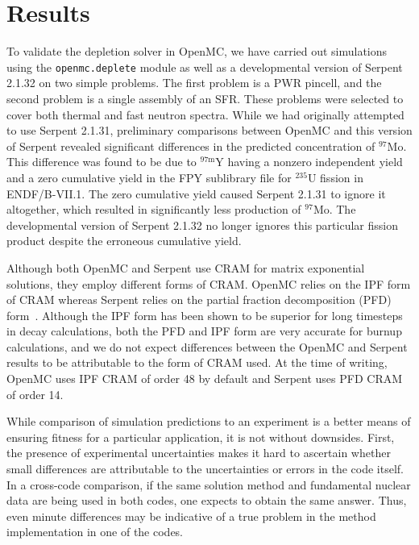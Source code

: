 \documentclass[3p,authoryear]{elsarticle}
\begin{document}
\section{Results}
\label{sec:results}

To validate the depletion solver in OpenMC, we have carried out simulations
using the \texttt{openmc.deplete} module as well as a developmental version of
Serpent 2.1.32 on two simple problems. The first problem is a PWR pincell, and
the second problem is a single assembly of an SFR. These problems were selected
to cover both thermal and fast neutron spectra. While we had originally
attempted to use Serpent 2.1.31, preliminary comparisons between OpenMC and this
version of Serpent revealed significant differences in the predicted
concentration of $^{97}$Mo. This difference was found to be due to
$^{97\text{m}}$Y having a nonzero independent yield and a zero cumulative yield
in the FPY sublibrary file for $^{235}$U fission in ENDF/B-VII.1. The zero
cumulative yield caused Serpent 2.1.31 to ignore it altogether, which resulted
in significantly less production of $^{97}$Mo. The developmental version of
Serpent 2.1.32 no longer ignores this particular fission product despite the
erroneous cumulative yield.

Although both OpenMC and Serpent use CRAM for matrix exponential solutions, they
employ different forms of CRAM. OpenMC relies on the IPF form of CRAM whereas
Serpent relies on the partial fraction decomposition (PFD)
form~\citep{pusa2016nse}. Although the IPF form has been shown to be superior
for long timesteps in decay calculations, both the PFD and IPF form are very
accurate for burnup calculations, and we do not expect differences between the
OpenMC and Serpent results to be attributable to the form of CRAM used. At the
time of writing, OpenMC uses IPF CRAM of order 48 by default and Serpent uses
PFD CRAM of order 14.

While comparison of simulation predictions to an experiment is a better means of
ensuring fitness for a particular application, it is not without downsides.
First, the presence of experimental uncertainties makes it hard to ascertain
whether small differences are attributable to the uncertainties or errors in the
code itself. In a cross-code comparison, if the same solution method and
fundamental nuclear data are being used in both codes, one expects to obtain the
same answer. Thus, even minute differences may be indicative of a true problem
in the method implementation in one of the codes.
\end{document}
